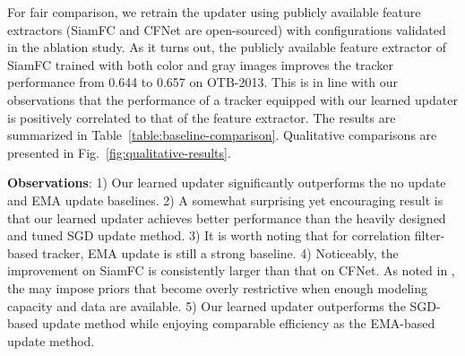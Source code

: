 \documentclass[journal]{IEEEtran}
\begin{document}
For fair comparison, we retrain the updater using publicly available feature extractors (SiamFC and CFNet are open-sourced) with configurations validated in the ablation study. As it turns out, the publicly available feature extractor of SiamFC trained with both color and gray images improves the tracker performance from 0.644 to 0.657 on OTB-2013. This is in line with our observations that the performance of a tracker equipped with our learned updater is positively correlated to that of the feature extractor.
 The results are summarized in Table~\ref{table:baseline-comparison}. Qualitative comparisons are presented in Fig.~\ref{fig:qualitative-results}.

\textbf{Observations}:
1) Our learned updater significantly outperforms the no update and EMA update baselines. 
2) A somewhat surprising yet encouraging result is that our learned updater achieves better performance than the heavily designed and tuned SGD update method. 
3) It is worth noting that for correlation filter-based tracker, EMA update is still a strong baseline.
4) Noticeably, the improvement on SiamFC is consistently larger than that on CFNet. As noted in \cite{valmadre2017end}, the  may impose priors that become overly restrictive when enough modeling capacity and data are available.
5) Our learned updater outperforms the SGD-based update method while enjoying comparable efficiency as the EMA-based update method.
\end{document}
